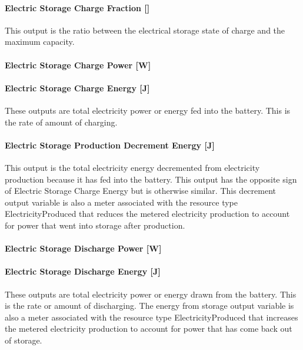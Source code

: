 \paragraph{Electric Storage Charge Fraction {[]}}\label{liion-charge-fraction}

This output is the ratio between the electrical storage state of charge and the maximum capacity.

\paragraph{Electric Storage Charge Power {[}W{]}}\label{liion-charge-power-w-1}

\paragraph{Electric Storage Charge Energy {[}J{]}}\label{liion-charge-energy-j-1}

These outputs are total electricity power or energy fed into the battery. This is the rate of amount of charging.

\paragraph{Electric Storage Production Decrement Energy {[}J{]}}\label{liion-production-decrement-energy-j-1}

This output is the total electricity energy decremented from electricity production because it has fed into the battery. This output has the opposite sign of Electric Storage Charge Energy but is otherwise similar. This decrement output variable is also a meter associated with the resource type ElectricityProduced that reduces the metered electricity production to account for power that went into storage after production.

\paragraph{Electric Storage Discharge Power {[}W{]}}\label{liion-discharge-power-w-1}

\paragraph{Electric Storage Discharge Energy {[}J{]}}\label{liion-discharge-energy-j-1}

These outputs are total electricity power or energy drawn from the battery. This is the rate or amount of discharging. The energy from storage output variable is also a meter associated with the resource type ElectricityProduced that increases the metered electricity production to account for power that has come back out of storage.

